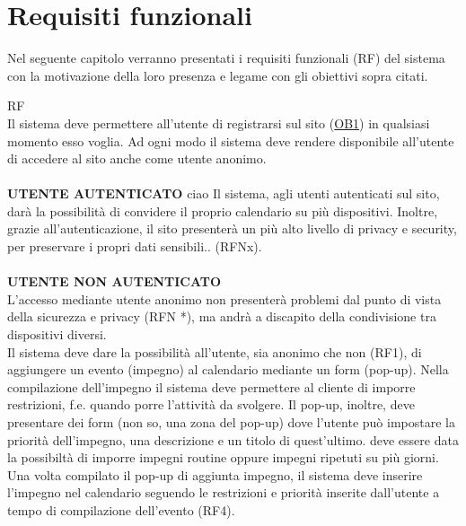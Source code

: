 \section{Requisiti funzionali}
\label{sec:RequisitiFunzionali}

Nel seguente capitolo verranno presentati i requisiti funzionali (RF)
del sistema con la motivazione della loro presenza e legame 
con gli obiettivi sopra citati. 
\begin {mylist} {RF}
      \\ %
    Il sistema deve permettere all'utente di registrarsi sul sito (\hyperlink{ob.one}{OB1}) in qualsiasi momento 
    esso voglia. Ad ogni modo il sistema deve rendere disponibile all'utente di accedere al sito
    anche come utente anonimo. \\ \\
    \textbf{UTENTE AUTENTICATO}
     {ciao}
    Il sistema, agli utenti autenticati sul sito, darà la possibilità di convidere 
    il proprio calendario su più dispositivi. Inoltre, grazie all'autenticazione, il sito
    presenterà un più alto livello di privacy e security, per preservare i propri dati sensibili..
    (RFNx). \\ \\
    \textbf{UTENTE NON AUTENTICATO}
     \\
    L'accesso mediante utente anonimo non presenterà problemi dal punto di vista 
    della sicurezza e privacy (RFN *), ma andrà a discapito della condivisione
    tra dispositivi diversi.
     \\
    Il sistema deve dare la possibilità all'utente, sia anonimo che non (RF1), di aggiungere
    un evento (impegno) al calendario mediante un form (pop-up). Nella compilazione
    dell'impegno il sistema deve permettere al cliente di imporre restrizioni, f.e. quando porre
    l'attività da svolgere. Il pop-up, inoltre, deve presentare dei form (non so, una 
    zona del pop-up) dove l'utente può impostare la priorità dell'impegno, una descrizione e un
    titolo di quest'ultimo.
    deve essere data la possibiltà di imporre impegni routine oppure impegni ripetuti su 
    più giorni. 
     \\
    Una volta compilato il pop-up di aggiunta impegno, il sistema 
    deve inserire l'impegno nel calendario seguendo le restrizioni e priorità inserite 
    dall'utente a tempo di compilazione dell'evento (RF4).  
     \\

\end{mylist}
